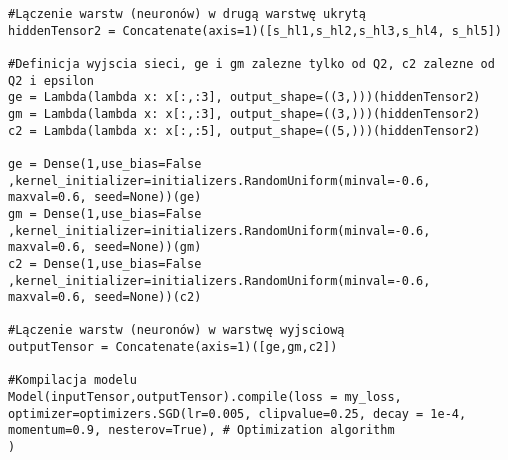 \documentclass[11pt]{book}
\theoremstyle{definition}
\begin{document}
\begin{lstlisting}
#Lączenie warstw (neuronów) w drugą warstwę ukrytą
hiddenTensor2 = Concatenate(axis=1)([s_hl1,s_hl2,s_hl3,s_hl4, s_hl5])

#Definicja wyjscia sieci, ge i gm zalezne tylko od Q2, c2 zalezne od Q2 i epsilon
ge = Lambda(lambda x: x[:,:3], output_shape=((3,)))(hiddenTensor2)
gm = Lambda(lambda x: x[:,:3], output_shape=((3,)))(hiddenTensor2)
c2 = Lambda(lambda x: x[:,:5], output_shape=((5,)))(hiddenTensor2)

ge = Dense(1,use_bias=False
,kernel_initializer=initializers.RandomUniform(minval=-0.6, maxval=0.6, seed=None))(ge)
gm = Dense(1,use_bias=False
,kernel_initializer=initializers.RandomUniform(minval=-0.6, maxval=0.6, seed=None))(gm)
c2 = Dense(1,use_bias=False
,kernel_initializer=initializers.RandomUniform(minval=-0.6, maxval=0.6, seed=None))(c2)   

#Lączenie warstw (neuronów) w warstwę wyjsciową
outputTensor = Concatenate(axis=1)([ge,gm,c2])

#Kompilacja modelu
Model(inputTensor,outputTensor).compile(loss = my_loss,
optimizer=optimizers.SGD(lr=0.005, clipvalue=0.25, decay = 1e-4, momentum=0.9, nesterov=True), # Optimization algorithm
) 
\end{lstlisting}
\end{document}
